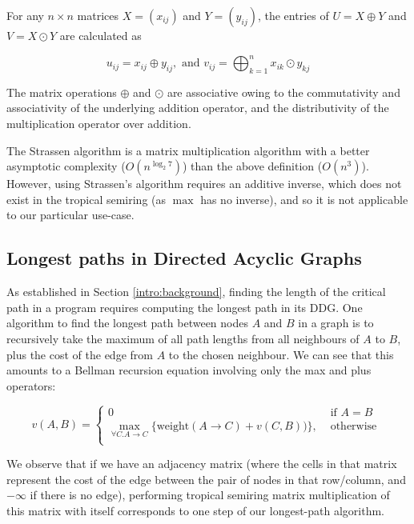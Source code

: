\begin{definition} \label{def:mat-mul}
For any $n\times n$ matrices $X = (x_{ij})$ and $Y = (y_{ij})$, the entries of $U = X \oplus Y$ and $V = X \odot Y$
are calculated as \cite{krivulin2012maxplusalgebraapproachmodelling}

$$
u_{ij} = x_{ij} \oplus y_{ij}, \text{ and } v_{ij} = \bigoplus_{k=1}^{n} x_{ik} \odot y_{kj}
$$

The matrix operations $\oplus$ and $\odot$ are associative owing to the commutativity and associativity of the underlying 
addition operator, and the distributivity of the multiplication operator over addition.

\end{definition}

The Strassen algorithm \cite{STRASSEN1969} is a matrix multiplication algorithm with a better asymptotic complexity 
($O(n^{\log_2 7})$) than the above definition ($O(n^3)$). However, using Strassen's algorithm requires an additive 
inverse, which does not exist in the tropical semiring (as $\max$ has no inverse),
and so it is not applicable to our particular use-case.

\subsection{Longest paths in Directed Acyclic Graphs}


As established in Section \ref{intro:background}, finding the length of the critical path in a program requires computing the longest path
in its DDG. 
One algorithm \cite{Chadderz} to find the longest path between nodes $A$ and $B$ in a graph is to recursively take the 
maximum of all path lengths from all neighbours of $A$ to $B$, plus the cost of the edge from $A$ to the chosen
neighbour. We can see that this amounts to a Bellman recursion equation \cite{Bellman:DynamicProgramming}
involving only the max and plus operators: 

$$
v(A,B) = 
\begin{cases}
0 &\text{ if } A = B \\
\max_{\forall C . A \to C} \{\mathrm{weight}(A \to C) + v(C,B))\}, &\text{ otherwise } \\
\end{cases}
$$

We observe that if we have an adjacency matrix (where the cells in that matrix represent the cost of the edge
between the pair of nodes in that row/column, and $-\infty$ if there is no edge), performing tropical semiring 
matrix multiplication of this matrix with itself corresponds to one step of our longest-path algorithm.

